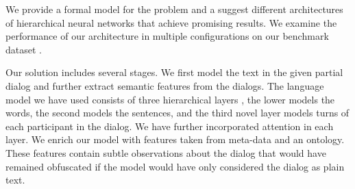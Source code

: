 
We provide a formal model for the problem and a suggest 
different architectures of hierarchical neural networks 
that achieve promising results. 
We examine the performance of our architecture 
in multiple configurations on our benchmark dataset \cite{frames}. 


Our solution includes several stages. 
We first model the text in the given partial dialog and further extract semantic features from the dialogs. 
The language model we have used consists of three hierarchical layers \cite{attention}, the lower 
models the words, the second models the sentences, 
and the third novel layer models turns of each participant in the dialog. 
We have further incorporated attention \cite{BahdanauCB14} in each layer. 
We enrich our model with features taken from meta-data and an ontology. 
These features contain subtle observations about the dialog that 
would have remained obfuscated if the model would have only considered the dialog as plain text. 


